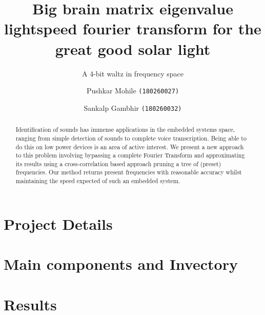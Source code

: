 \documentclass{llncs}
\title{Big brain matrix eigenvalue lightspeed fourier transform for the great good solar light}
\subtitle{A 4-bit waltz in frequency space}
\author{Pushkar Mohile \texttt{(180260027)} \and Sankalp Gambhir \texttt{(180260032)}}
\institute{Indian Institute of Technology, Bombay}
\begin{document}
    \maketitle

    \begin{abstract}
    Identification of sounds has immense applications in the embedded systems space,
    ranging from simple detection of sounds to complete voice transcription. Being
    able to do this on low power devices is an area of active interest. We present a
    new approach to this problem involving bypassing a complete Fourier Transform
    and approximating its results using a cross-correlation based approach pruning a
    tree of (preset) frequencies. Our method returns present frequencies with
    reasonable accuracy whilst maintaining the speed expected of such an embedded
    system.
    \end{abstract}

    \section{Project Details}
        

    \section{Main components and Invectory}
        

    \section{Results}
        

    \newpage
        
\end{document}
